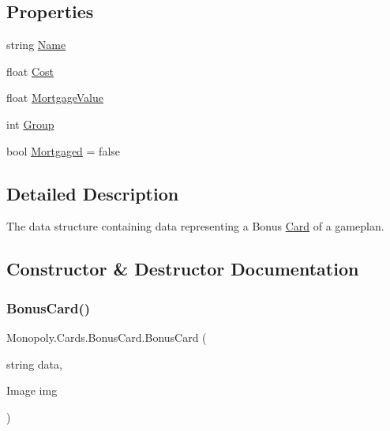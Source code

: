 \subsection*{Properties}
\begin{DoxyCompactItemize}
\item 
string \mbox{\hyperlink{class_monopoly_1_1_cards_1_1_card_ac114f0ec54d1b86154e9c596c3980003}{Name}}
\item 
float \mbox{\hyperlink{class_monopoly_1_1_cards_1_1_card_a67df91aa53596b2ce61ef2c3386ddd7c}{Cost}}
\item 
float \mbox{\hyperlink{class_monopoly_1_1_cards_1_1_card_adb2af81dda38706437f368b088c9b1a6}{Mortgage\+Value}}
\item 
int \mbox{\hyperlink{class_monopoly_1_1_cards_1_1_card_a90d55a4790f3d8afeba0203b70fa2086}{Group}}
\item 
bool \mbox{\hyperlink{class_monopoly_1_1_cards_1_1_card_a5569d582a0692b3a37c81dd2320cc367}{Mortgaged}} = false
\end{DoxyCompactItemize}


\subsection{Detailed Description}
The data structure containing data representing a Bonus \mbox{\hyperlink{class_monopoly_1_1_cards_1_1_card}{Card}} of a gameplan. 

\subsection{Constructor \& Destructor Documentation}
\mbox{\label{class_monopoly_1_1_cards_1_1_bonus_card_a444094e643634f0c671c43917f44412f}} 
\subsubsection{\texorpdfstring{Bonus\+Card()}{BonusCard()}}
{\footnotesize\ttfamily Monopoly.\+Cards.\+Bonus\+Card.\+Bonus\+Card (\begin{DoxyParamCaption}\item[{string}]{data,  }\item[{Image}]{img }\end{DoxyParamCaption})\hspace{0.3cm}{\ttfamily [inline]}}

